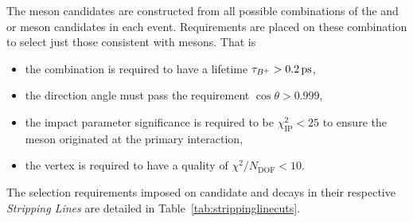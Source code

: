 The \Bp meson candidates are constructed from all possible combinations of the \Dsp and \phiz or \Dzb meson candidates in each event.
Requirements are placed on these combination to select just those consistent with \Bp mesons.
That is
\begin{itemize}
\item the combination is required to have a lifetime $\tau_{{{{B}^+}}} > 0.2{\mathrm{ \,ps}}$, 
\item the direction angle must pass the requirement $\cos{\theta}>0.999$,
\item the impact parameter significance is required to be $\chi^{2}_{\text{IP}} < 25$ to ensure the \Bp meson originated at the primary interaction, 
\item the vertex is required to have a quality of $\chi^{2}/N_{\text{DOF}} < 10$. 
\end{itemize}
The selection requirements imposed on candidate \decay{\Bp}{\Dsp\phiz} and \decay{\Bp}{\Dsp\Kp\Km} decays in their respective \emph{Stripping Lines} are detailed in Table~\ref{tab:strippinglinecuts}. 


